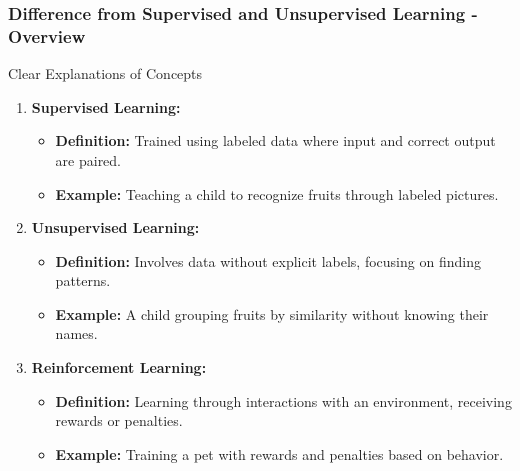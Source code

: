 \documentclass[aspectratio=169]{beamer}
\begin{document}
\begin{frame}[fragile]
    \frametitle{Difference from Supervised and Unsupervised Learning - Overview}
    \begin{block}{Clear Explanations of Concepts}
        \begin{enumerate}
            \item \textbf{Supervised Learning:}
            \begin{itemize}
                \item \textbf{Definition:} Trained using labeled data where input and correct output are paired.
                \item \textbf{Example:} Teaching a child to recognize fruits through labeled pictures.
            \end{itemize}
            
            \item \textbf{Unsupervised Learning:}
            \begin{itemize}
                \item \textbf{Definition:} Involves data without explicit labels, focusing on finding patterns.
                \item \textbf{Example:} A child grouping fruits by similarity without knowing their names.
            \end{itemize}
            
            \item \textbf{Reinforcement Learning:}
            \begin{itemize}
                \item \textbf{Definition:} Learning through interactions with an environment, receiving rewards or penalties.
                \item \textbf{Example:} Training a pet with rewards and penalties based on behavior.
            \end{itemize}
        \end{enumerate}
    \end{block}
\end{frame}
\end{document}

